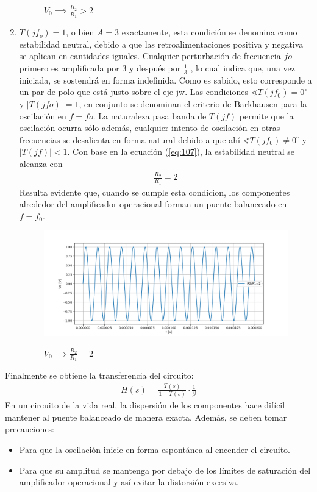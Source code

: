\begin{enumerate}
\begin{figure}[H]
	\label{fig:r1r2g}
	\caption{$V_0 \implies \frac{R_2}{R_1}>2$}
\end{figure}
\item  $T(jf_o) = 1$, o bien $A= 3$ exactamente, esta condición se denomina como estabilidad
neutral, debido a que las retroalimentaciones positiva y negativa se aplican en cantidades iguales. Cualquier perturbación de frecuencia $fo$ primero es amplificada por 3  y
después por $\frac{1}{3}$ , lo cual indica que, una vez iniciada, se sostendrá en forma indefinida. Como es sabido, esto corresponde a un par de polo que está justo sobre el eje jw. Las
condiciones $\sphericalangle T(jf_0)= 0^\circ$ y $|T(jfo)|= 1$, en conjunto se denominan el criterio de
Barkhausen para la oscilación en $f=fo$. La naturaleza pasa banda de $T(jf)$ permite que la
oscilación ocurra sólo además, cualquier intento de oscilación en otras frecuencias se desalienta en forma natural debido a que ahí  $\sphericalangle T(jf_0) \neq 0^\circ$ y $|T(jf)| < 1$. Con base en la
ecuación (\ref{eq:107}), la estabilidad neutral se alcanza con 
\begin{align}
\frac{R_2}{R_1}=2
\end{align}
Resulta evidente que, cuando se cumple esta condicion, los componentes alrededor del amplificador operacional forman un puente balanceado en $f=f_0$.
\begin{figure}[H]
	\centering
	\includegraphics[width=\textwidth]{Imagenes-Ej1/r2r1e.png}
	\label{fig:r1r2e}
	\caption{$V_0 \implies \frac{R_2}{R_1}=2$}
\end{figure}
\end{enumerate}
Finalmente se obtiene la transferencia del circuito:
\begin{align}
H(s)=\frac{T(s)}{1-T(s)}\cdot \frac{1}{\beta}
\end{align}
En un circuito de la vida real, la dispersión de los componentes hace difícil mantener al
puente balanceado de manera exacta. Además, se deben tomar precauciones: 
\begin{itemize}
\item Para que la
oscilación inicie en forma espontánea al encender el circuito.
\item Para que su amplitud se
mantenga por debajo de los límites de saturación del amplificador operacional y así evitar la distorsión excesiva.

\end{itemize}

